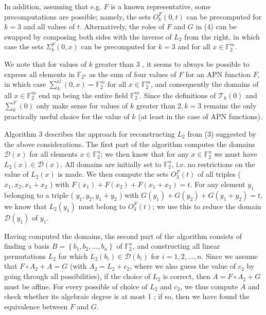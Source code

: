 \documentclass[10pt]{article}
\begin{document}
In addition, assuming that e.g. $F$ is a known representative, some precomputations are possible; namely, the sets $O_{k}^{F}(0, t)$ can be precomputed for $k=3$ and all values of $t$. Alternatively, the roles of $F$ and $G$ in (4) can be swapped by composing both sides with the inverse of $L_{2}$ from the right, in which case the sets $\Sigma_{k}^{F}(0, x)$ can be precomputed for $k=3$ and for all $x \in \mathbb{F}_{2}^{m}$.

We note that for values of $k$ greater than 3 , it seems to always be possible to express all elements in $\mathbb{F}_{2^{n}}$ as the sum of four values of $F$ for an APN function $F$, in which case $\sum_{k}^{G}(0, x)=\mathbb{F}_{2}^{m}$ for all $x \in \mathbb{F}_{2}^{m}$, and consequently the domains of all $x \in \mathbb{F}_{2}^{m}$ end up being the entire field $\mathbb{F}_{2}^{m}$. Since the definitions of $\mathcal{T}_{k}(0)$ and $\sum_{k}^{F}(0)$ only make sense for values of $k$ greater than $2, k=3$ remains the only practically useful choice for the value of $k$ (at least in the case of APN functions).

Algorithm 3 describes the approach for reconstructing $L_{2}$ from (3) suggested by the above considerations. The first part of the algorithm computes the domains $\mathcal{D}(x)$ for all elements $x \in \mathbb{F}_{2}^{n}$; we then know that for any $x \in \mathbb{F}_{2}^{n}$ we must have $L_{2}(x) \in \mathcal{D}(x)$. All domains are initially set to $\mathbb{F}_{2}^{n}$, i.e. no restrictions on the value of $L_{2}(x)$ is made. We then compute the sets $O_{3}^{F}(t)$ of all triples ( $x_{1}, x_{2}, x_{1}+x_{2}$ ) with $F\left(x_{1}\right)+F\left(x_{2}\right)+F\left(x_{1}+x_{2}\right)=t$. For any element $y_{1}$ belonging to a triple ( $y_{1}, y_{2}, y_{1}+y_{2}$ ) with $G\left(y_{1}\right)+G\left(y_{2}\right)+G\left(y_{1}+y_{2}\right)= t$, we know that $L_{2}\left(y_{1}\right)$ must belong to $O_{3}^{F}(t)$; we use this to reduce the domain $\mathcal{D}\left(y_{1}\right)$ of $y_{1}$.

Having computed the domains, the second part of the algorithm consists of finding a basis $B=\left\{b_{1}, b_{2}, \ldots, b_{n}\right\}$ of $\mathbb{F}_{2}^{n}$, and constructing all linear permutations $L_{2}$ for which $L_{2}\left(b_{i}\right) \in \mathcal{D}\left(b_{i}\right)$ for $i=1,2, \ldots, n$. Since we assume that $F \circ A_{2}+A=G$ (with $A_{2}= L_{2}+c_{2}$, where we also guess the value of $c_{2}$ by going through all possibilities), if the choice of $L_{2}$ is correct, then $A=F \circ A_{2}+G$ must be affine. For every possible of choice of $L_{2}$ and $c_{2}$, we thus compute $A$ and check whether its algebraic degree is at most 1 ; if so, then we have found the equivalence between $F$ and $G$.
\end{document}
